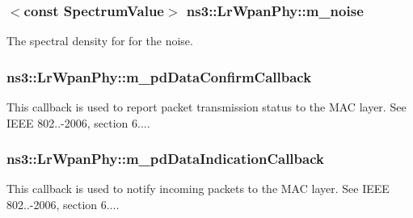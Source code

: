 \subsubsection[{\texorpdfstring{m\+\_\+noise}{m_noise}}]{$<$const {\bf Spectrum\+Value}$>$ ns3\+::\+Lr\+Wpan\+Phy\+::m\+\_\+noise\hspace{0.3cm}{\ttfamily [private]}}\hypertarget{classns3_1_1LrWpanPhy_a02560969747aa24f7bded61743f5cc37}{}\label{classns3_1_1LrWpanPhy_a02560969747aa24f7bded61743f5cc37}
The spectral density for for the noise. 
\subsubsection[{\texorpdfstring{m\+\_\+pd\+Data\+Confirm\+Callback}{m_pdDataConfirmCallback}}]{ ns3\+::\+Lr\+Wpan\+Phy\+::m\+\_\+pd\+Data\+Confirm\+Callback\hspace{0.3cm}{\ttfamily [private]}}\hypertarget{classns3_1_1LrWpanPhy_a6f736d7cb72829ef100315c1b8f6ea05}{}\label{classns3_1_1LrWpanPhy_a6f736d7cb72829ef100315c1b8f6ea05}
This callback is used to report packet transmission status to the M\+AC layer. See I\+E\+EE 802..-\/2006, section 6.... 
\subsubsection[{\texorpdfstring{m\+\_\+pd\+Data\+Indication\+Callback}{m_pdDataIndicationCallback}}]{ ns3\+::\+Lr\+Wpan\+Phy\+::m\+\_\+pd\+Data\+Indication\+Callback\hspace{0.3cm}{\ttfamily [private]}}\hypertarget{classns3_1_1LrWpanPhy_a94de3241a0050cc21f5a57fdbc951c9e}{}\label{classns3_1_1LrWpanPhy_a94de3241a0050cc21f5a57fdbc951c9e}
This callback is used to notify incoming packets to the M\+AC layer. See I\+E\+EE 802..-\/2006, section 6.... 
